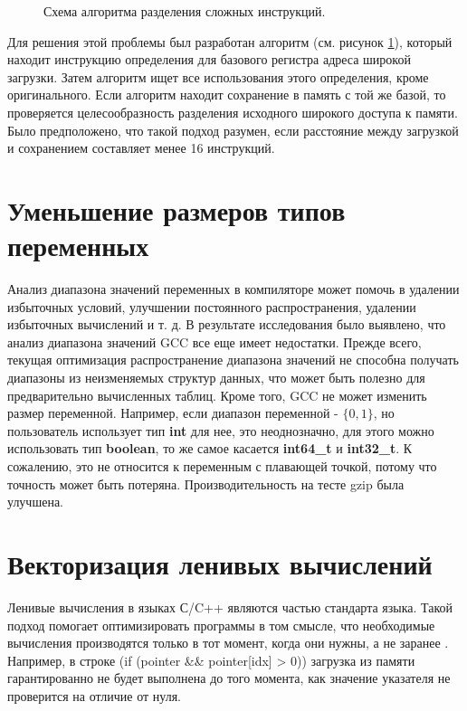 \begin{figure}[htbp]
	\centering
	
	\caption{Схема алгоритма разделения сложных инструкций.}
	\label{splitsvg2}
\end{figure}

Для решения этой проблемы был разработан алгоритм (см. рисунок \ref{splitsvg2}), который находит инструкцию определения для базового регистра адреса широкой загрузки. Затем алгоритм ищет все использования этого определения, кроме оригинального. Если алгоритм находит сохранение в память с той же базой, то проверяется целесообразность разделения исходного широкого доступа к памяти. Было предположено, что такой подход разумен, если расстояние между загрузкой и сохранением составляет менее 16 инструкций.

 \section {Уменьшение размеров типов переменных}
 Анализ диапазона значений переменных в компиляторе \cite{harrison1977compiler,  simon2008value}  может помочь в удалении избыточных условий, улучшении постоянного распространения, удалении избыточных вычислений и т. д. В результате исследования было выявлено, что анализ диапазона значений GCC все еще имеет недостатки. Прежде всего, текущая оптимизация распространение диапазона значений не способна получать диапазоны из неизменяемых структур данных, что может быть полезно для предварительно вычисленных таблиц. Кроме того, GCC не может изменить размер переменной. Например, если диапазон переменной - $\{0, 1\}$, но пользователь использует тип \textbf{int} для нее, это неоднозначно, для этого можно использовать тип \textbf{boolean}, то же самое касается \textbf{int64\_t} и \textbf{int32\_t}. К сожалению, это не относится к переменным с плавающей точкой, потому что точность может быть потеряна. Производительность на тесте gzip была улучшена.
 
 \section {Векторизация ленивых вычислений}\label{ch2:lcv}
 Ленивые вычисления в языках С/C++ являются частью стандарта языка. Такой подход помогает оптимизировать программы в том смысле, что необходимые вычисления производятся только в тот момент, когда они нужны, а не заранее \cite{cukic2018functional}. Например, в строке (if (pointer \&\& pointer[idx] > 0)) загрузка из памяти гарантированно  не будет выполнена до того момента, как значение указателя не проверится на отличие от нуля. 
 
